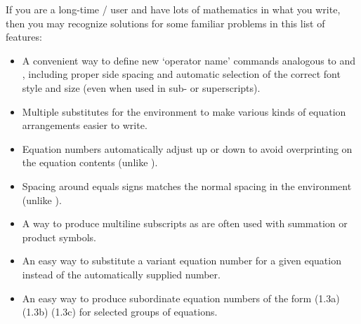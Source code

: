 \documentclass[leqno,titlepage,openany]{amsldoc}[1999/12/13]
\makeatletter
\let\oldcs\cs
\def\cs#1{\texorpdfstring{\oldcs{#1}}{\@backslashchar\@backslashchar#1}}
\let\cn\cs
\makeatother
\begin{document}
If you are a long-time \latex/ user and have lots of mathematics in what
you write, then you may recognize solutions for some familiar problems
in this list of  features:
\begin{itemize}

\item A convenient way to define new `operator name' commands analogous
to \cn{sin} and \cn{lim}, including proper side spacing and automatic
selection of the correct font style and size (even when used in
sub- or superscripts).

\item Multiple substitutes for the  environment to make
various kinds of equation arrangements easier to write.

\item Equation numbers automatically adjust up or down to avoid
overprinting on the equation contents (unlike ).

\item Spacing around equals signs matches the normal spacing in the
 environment (unlike ).

\item A way to produce multiline subscripts as are often used with
summation or product symbols.

\item An easy way to substitute a variant equation number for a given
equation instead of the automatically supplied number.

\item An easy way to produce subordinate equation numbers of the form
(1.3a) (1.3b) (1.3c) for selected groups of equations.

\end{itemize}
\end{document}
